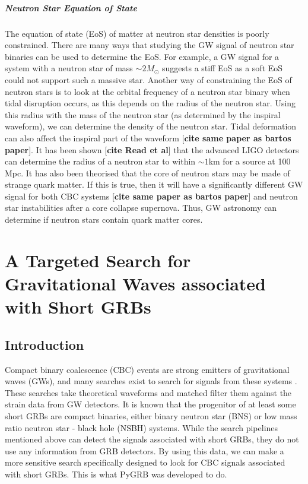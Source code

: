\documentclass[11pt]{cuthesis}
\begin{document}
\paragraph{Neutron Star Equation of State}
The equation of state (EoS) of matter at neutron star densities is poorly constrained. There are many ways that studying the GW signal of neutron star binaries can be used to determine the EoS. For example, a GW signal for a system with a neutron star of mass $\sim 2M_\odot$ suggests a stiff EoS as a soft EoS could not support such a massive star. Another way of constraining the EoS of neutron stars is to look at the orbital frequency of a neutron star binary when tidal disruption occurs, as this depends on the radius of the neutron star. Using this radius with the mass of the neutron star (as determined by the inspiral waveform), we can determine the density of the neutron star. Tidal deformation can also affect the inspiral part of the waveform [\textbf{cite same paper as bartos paper}]. It has been shown [\textbf{cite Read et al}] that the advanced LIGO detectors can determine the radius of a neutron star to within $\sim 1$km for a source at 100 Mpc. It has also been theorised that the core of neutron stars may be made of strange quark matter. If this is true, then it will have a significantly different GW signal for both CBC systems [\textbf{cite same paper as bartos paper}] and neutron star instabilities after a core collapse supernova. Thus, GW astronomy can determine if neutron stars contain quark matter cores. 


\chapter{A Targeted Search for Gravitational Waves associated with Short GRBs} \label{chap: CBC}
\section{Introduction}\label{CBCintro}
Compact binary coalescence (CBC) events are strong emitters of gravitational waves (GWs), and many searches exist to search for signals from these systems \cite{pycbc_Usman:2015} \cite{gstlal_Sachdev:2019} \cite{gstlal_messick}. These searches take theoretical waveforms \cite{phenom_Khan:2015} and matched filter them against the strain data from GW detectors. It is known that the progenitor of at least some short GRBs are compact binaries, either binary neutron star (BNS) or low mass ratio neutron star - black hole (NSBH) systems. While the search pipelines mentioned above can detect the signals associated with short GRBs, they do not use any information from GRB detectors. By using this data, we can make a more sensitive search specifically designed to look for CBC signals associated with short GRBs. This is what PyGRB was developed to do.
\end{document}
